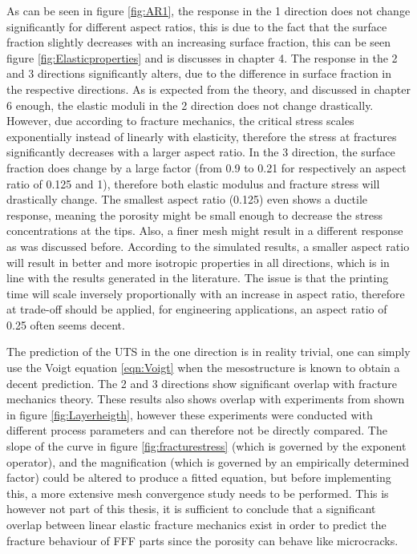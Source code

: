 As can be seen in figure \ref{fig:AR1}, the response in the 1 direction does not change significantly for different aspect ratios, this is due to the fact that the surface fraction slightly decreases with an increasing surface fraction, this can be seen figure \ref{fig:Elasticproperties} and is discusses in chapter 4. The response in the 2 and 3 directions significantly alters, due to the difference in surface fraction in the respective directions. As is expected from the theory, and discussed in chapter 6 enough, the elastic moduli in the 2 direction does not change drastically. However, due according to fracture mechanics, the critical stress scales exponentially instead of linearly with elasticity, therefore the stress at fractures significantly decreases with a larger aspect ratio.  In the 3 direction, the surface fraction does change by a large factor (from 0.9 to 0.21 for respectively an aspect ratio of 0.125 and 1), therefore both elastic modulus and fracture stress will drastically change. The smallest aspect ratio (0.125) even shows a ductile response, meaning the porosity might be small enough to decrease the stress concentrations at the tips. Also, a finer mesh might result in a different response as was discussed before. 
According to the simulated results, a smaller aspect ratio will result in better and more isotropic properties in all directions, which is in line with the results generated in the literature. The issue is that the printing time will scale inversely proportionally with an increase in aspect ratio, therefore at trade-off should be applied, for engineering applications, an aspect ratio of 0.25 often seems decent. 

The prediction of the UTS in the one direction is in reality trivial, one can simply use the Voigt equation \ref{eqn:Voigt} when the mesostructure is known to obtain a decent prediction.  The 2 and 3 directions show significant overlap with fracture mechanics theory. These results also shows overlap with experiments from \cite{Li2017TheProperties} shown in figure \ref{fig:Layerheigth}, however these experiments were conducted with different process parameters and can therefore not be directly compared. The slope of the curve in figure \ref{fig:fracturestress} (which is governed by the exponent operator), and the magnification (which is governed by an empirically determined factor) could be altered to produce a fitted equation, but before implementing this, a more extensive mesh convergence study needs to be performed. This is however not part of this thesis, it is sufficient to conclude that a significant overlap between linear elastic fracture mechanics exist in order to predict the fracture behaviour of FFF parts since the porosity can behave like microcracks. 

